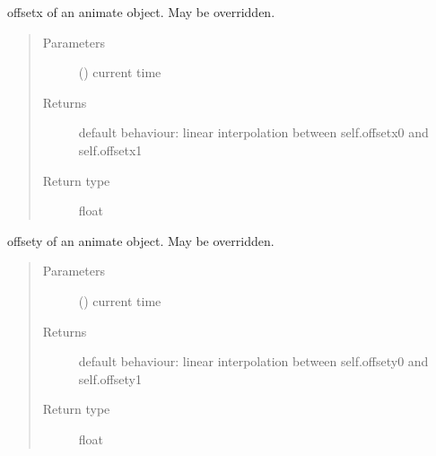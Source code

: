 \documentclass[letterpaper,10pt,english]{sphinxmanual}
\begin{document}
\begin{fulllineitems}

\begin{fulllineitems}
\label{\detokenize{Reference:salabim.Animate.offsetx}}
offsetx of an animate object. May be overridden.
\begin{quote}\begin{description}
\item[{Parameters}] \leavevmode
{} () \textendash{} current time

\item[{Returns}] \leavevmode
{} \textendash{} default behaviour: linear interpolation between self.offsetx0 and self.offsetx1

\item[{Return type}] \leavevmode
float

\end{description}\end{quote}

\end{fulllineitems}


\begin{fulllineitems}
\label{\detokenize{Reference:salabim.Animate.offsety}}
offsety of an animate object. May be overridden.
\begin{quote}\begin{description}
\item[{Parameters}] \leavevmode
{} () \textendash{} current time

\item[{Returns}] \leavevmode
{} \textendash{} default behaviour: linear interpolation between self.offsety0 and self.offsety1

\item[{Return type}] \leavevmode
float

\end{description}\end{quote}

\end{fulllineitems}



\end{fulllineitems}
\end{document}
